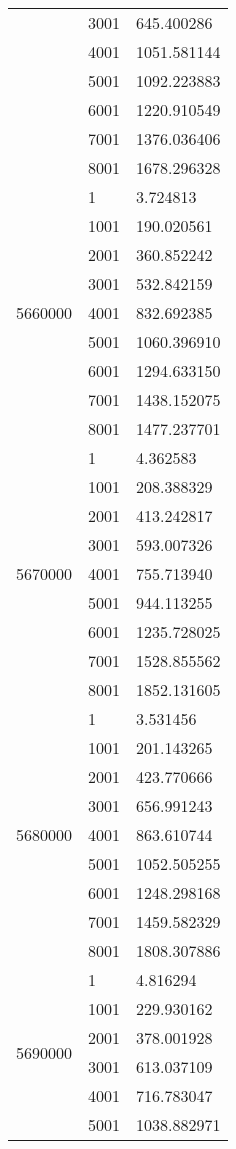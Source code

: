 \begin{table}[htb!]
\begin{tabular}{lll}
 & 3001 & 645.400286 \\
 & 4001 & 1051.581144 \\
 & 5001 & 1092.223883 \\
 & 6001 & 1220.910549 \\
 & 7001 & 1376.036406 \\
 & 8001 & 1678.296328 \\
\multirow[c]{9}{*}{5660000} & 1 & 3.724813 \\
 & 1001 & 190.020561 \\
 & 2001 & 360.852242 \\
 & 3001 & 532.842159 \\
 & 4001 & 832.692385 \\
 & 5001 & 1060.396910 \\
 & 6001 & 1294.633150 \\
 & 7001 & 1438.152075 \\
 & 8001 & 1477.237701 \\
\multirow[c]{9}{*}{5670000} & 1 & 4.362583 \\
 & 1001 & 208.388329 \\
 & 2001 & 413.242817 \\
 & 3001 & 593.007326 \\
 & 4001 & 755.713940 \\
 & 5001 & 944.113255 \\
 & 6001 & 1235.728025 \\
 & 7001 & 1528.855562 \\
 & 8001 & 1852.131605 \\
\multirow[c]{9}{*}{5680000} & 1 & 3.531456 \\
 & 1001 & 201.143265 \\
 & 2001 & 423.770666 \\
 & 3001 & 656.991243 \\
 & 4001 & 863.610744 \\
 & 5001 & 1052.505255 \\
 & 6001 & 1248.298168 \\
 & 7001 & 1459.582329 \\
 & 8001 & 1808.307886 \\
\multirow[c]{9}{*}{5690000} & 1 & 4.816294 \\
 & 1001 & 229.930162 \\
 & 2001 & 378.001928 \\
 & 3001 & 613.037109 \\
 & 4001 & 716.783047 \\
 & 5001 & 1038.882971 \\

\end{tabular}
\end{table}
